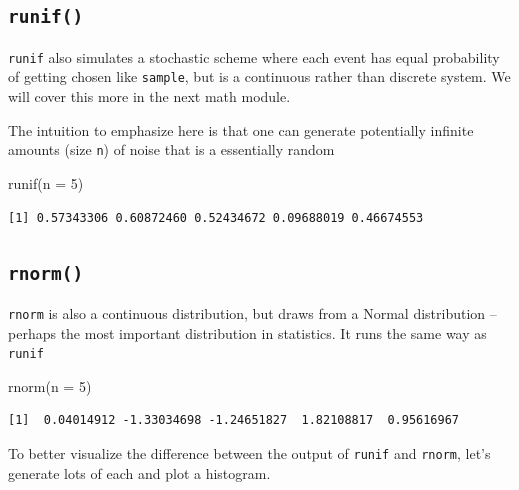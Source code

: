 \documentclass[
  letterpaper,
]{book}
\newenvironment{Shaded}{\begin{snugshade}}{\end{snugshade}}
\newcommand{\AttributeTok}[1]{\textcolor[rgb]{0.40,0.45,0.13}{#1}}
\newcommand{\DecValTok}[1]{\textcolor[rgb]{0.68,0.00,0.00}{#1}}
\newcommand{\FunctionTok}[1]{\textcolor[rgb]{0.28,0.35,0.67}{#1}}
\newcommand{\NormalTok}[1]{\textcolor[rgb]{0.00,0.23,0.31}{#1}}
\theoremstyle{definition}
\theoremstyle{definition}
\theoremstyle{plain}
\theoremstyle{definition}
\theoremstyle{plain}
\theoremstyle{plain}
\theoremstyle{remark}
\begin{document}
\hypertarget{runif}{%
\subsection*{\texorpdfstring{\texttt{runif()}}{runif()}}\label{runif}}

\texttt{runif} also simulates a stochastic scheme where each event has
equal probability of getting chosen like \texttt{sample}, but is a
continuous rather than discrete system. We will cover this more in the
next math module.

The intuition to emphasize here is that one can generate potentially
infinite amounts (size \texttt{n}) of noise that is a essentially random

\begin{Shaded}
\begin{Highlighting}[]
\FunctionTok{runif}\NormalTok{(}\AttributeTok{n =} \DecValTok{5}\NormalTok{)}
\end{Highlighting}
\end{Shaded}

\begin{verbatim}
[1] 0.57343306 0.60872460 0.52434672 0.09688019 0.46674553
\end{verbatim}

\hypertarget{rnorm}{%
\subsection*{\texorpdfstring{\texttt{rnorm()}}{rnorm()}}\label{rnorm}}

\texttt{rnorm} is also a continuous distribution, but draws from a
Normal distribution -- perhaps the most important distribution in
statistics. It runs the same way as \texttt{runif}

\begin{Shaded}
\begin{Highlighting}[]
\FunctionTok{rnorm}\NormalTok{(}\AttributeTok{n =} \DecValTok{5}\NormalTok{)}
\end{Highlighting}
\end{Shaded}

\begin{verbatim}
[1]  0.04014912 -1.33034698 -1.24651827  1.82108817  0.95616967
\end{verbatim}

To better visualize the difference between the output of \texttt{runif}
and \texttt{rnorm}, let's generate lots of each and plot a histogram.
\end{document}
